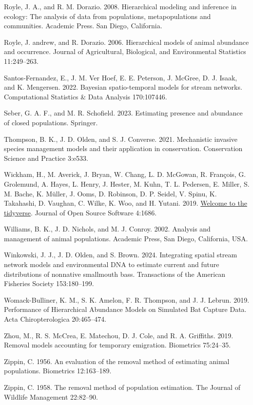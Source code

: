 \documentclass[
  11pt,
  a4paper,
]{article}
\newlength{\cslhangindent}
\newenvironment{CSLReferences}[2] %
 {\begin{list}{}{%
  \setlength{\itemindent}{0pt}
  \setlength{\leftmargin}{0pt}
  \setlength{\parsep}{0pt}
  \ifodd #1
   \setlength{\leftmargin}{\cslhangindent}
   \setlength{\itemindent}{-1\cslhangindent}
  \fi
  \setlength{\itemsep}{#2\baselineskip}}}
 {\end{list}}
\begin{document}
\begin{CSLReferences}{1}{0}
Royle, J. A., and R. M. Dorazio. 2008. Hierarchical modeling and inference in ecology: The analysis of data from populations, metapopulations and communities. Academic Press. San Diego, California.

Royle, J. andrew, and R. Dorazio. 2006. Hierarchical models of animal abundance and occurrence. Journal of Agricultural, Biological, and Environmental Statistics 11:249--263.

Santos-Fernandez, E., J. M. Ver Hoef, E. E. Peterson, J. McGree, D. J. Isaak, and K. Mengersen. 2022. Bayesian spatio-temporal models for stream networks. Computational Statistics \& Data Analysis 170:107446.

Seber, G. A. F., and M. R. Schofield. 2023. Estimating presence and abundance of closed populations. Springer.

Thompson, B. K., J. D. Olden, and S. J. Converse. 2021. Mechanistic invasive species management models and their application in conservation. Conservation Science and Practice 3:e533.

Wickham, H., M. Averick, J. Bryan, W. Chang, L. D. McGowan, R. François, G. Grolemund, A. Hayes, L. Henry, J. Hester, M. Kuhn, T. L. Pedersen, E. Miller, S. M. Bache, K. Müller, J. Ooms, D. Robinson, D. P. Seidel, V. Spinu, K. Takahashi, D. Vaughan, C. Wilke, K. Woo, and H. Yutani. 2019. \href{https://doi.org/10.21105/joss.01686}{Welcome to the {tidyverse}}. Journal of Open Source Software 4:1686.

Williams, B. K., J. D. Nichols, and M. J. Conroy. 2002. Analysis and management of animal populations. Academic Press, San Diego, California, USA.

Winkowski, J. J., J. D. Olden, and S. Brown. 2024. Integrating spatial stream network models and environmental DNA to estimate current and future distributions of nonnative smallmouth bass. Transactions of the American Fisheries Society 153:180--199.

Womack-Bulliner, K. M., S. K. Amelon, F. R. Thompson, and J. J. Lebrun. 2019. {Performance of Hierarchical Abundance Models on Simulated Bat Capture Data}. Acta Chiropterologica 20:465--474.

Zhou, M., R. S. McCrea, E. Matechou, D. J. Cole, and R. A. Griffiths. 2019. Removal models accounting for temporary emigration. Biometrics 75:24--35.

Zippin, C. 1956. An evaluation of the removal method of estimating animal populations. Biometrics 12:163--189.

Zippin, C. 1958. The removal method of population estimation. The Journal of Wildlife Management 22:82--90.

\end{CSLReferences}
\end{document}
